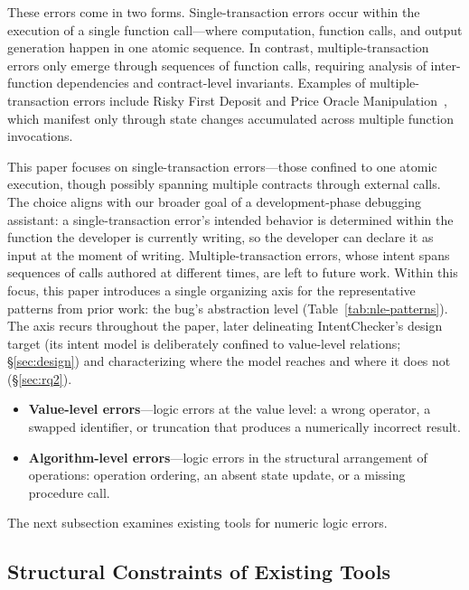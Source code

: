 \documentclass[pdflatex,sn-basic]{sn-jnl}%
\theoremstyle{thmstyleone}%
\theoremstyle{thmstyletwo}%
\theoremstyle{thmstylethree}%
\begin{document}
These errors come in two forms.
Single-transaction errors occur within the execution of a single function call---where computation, function calls, and output generation happen in one atomic sequence.
In contrast, multiple-transaction errors only emerge through sequences of function calls, requiring analysis of inter-function dependencies and contract-level invariants.
Examples of multiple-transaction errors include Risky First Deposit and Price Oracle Manipulation~\citep{gptscan, exploitablebugs}, which manifest only through state changes accumulated across multiple function invocations.

This paper focuses on single-transaction errors---those confined to one atomic execution, though possibly spanning multiple contracts through external calls. The choice aligns with our broader goal of a development-phase debugging assistant: a single-transaction error's intended behavior is determined within the function the developer is currently writing, so the developer can declare it as input at the moment of writing. Multiple-transaction errors, whose intent spans sequences of calls authored at different times, are left to future work. Within this focus, this paper introduces a single organizing axis for the representative patterns from prior work: the bug's abstraction level (Table~\ref{tab:nle-patterns}). The axis recurs throughout the paper, later delineating IntentChecker's design target (its intent model is deliberately confined to value-level relations; §\ref{sec:design}) and characterizing where the model reaches and where it does not (§\ref{sec:rq2}).
\begin{itemize}
    \item \textbf{Value-level errors}---logic errors at the value level: a wrong operator, a swapped identifier, or truncation that produces a numerically incorrect result.
    \item \textbf{Algorithm-level errors}---logic errors in the structural arrangement of operations: operation ordering, an absent state update, or a missing procedure call.
\end{itemize}

The next subsection examines existing tools for numeric logic errors.

\subsection{Structural Constraints of Existing Tools}
\end{document}
